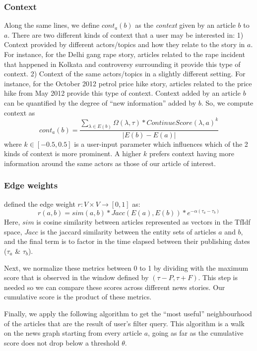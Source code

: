 \subsubsection*{Context}
Along the same lines, we define $cont_{a}(b)$ as the \emph{context} given by an article $b$ to $a$. There are two different kinds of context that a user may be interested in: 1) Context provided by different actors/topics and how they relate
to the story in $a$. For instance, for the Delhi gang rape story, articles related to the rape incident that happened in Kolkata and controversy surrounding it provide this type of context. 2) Context of the same actors/topics in a slightly different setting. For instance, for the October 2012 petrol price hike story, articles related to the price hike from May 2012 provide this type of context. Context added by an article $b$ can be quantified by the degree of ``new information'' added by $b$.
So, we compute context as
\begin{equation}
cont_{a}(b) = \frac{\sum_{\lambda \in E(b)}{\Omega(\lambda, \tau)*ContinueScore(\lambda, a)^{k}}}{|E(b) - E(a)|}
\end{equation}
where $k \in [-0.5, 0.5]$ is a user-input parameter which influences which of the 2 kinds of context is more prominent. A higher $k$ prefers context having more information
around the same actors as those of our article of interest.

\subsubsection*{Edge weights}
\cite{choudhary@ecir2008} defined the edge weight $r:V \times V \rightarrow [0,1]$ as:
\begin{equation}
r(a, b) = sim(a,b) * Jacc(E(a), E(b)) * e^{-\alpha(\tau_a - \tau_b)}
\end{equation}
Here, $sim$ is cosine similarity between articles represented as vectors in the TfIdf space, $Jacc$ is the jaccard similarity between
the entity sets of articles $a$ and $b$, and the final term is to factor in the time elapsed between their publishing dates ($\tau_a$ \& $\tau_b$).

Next, we normalize these metrics between 0 to 1 by dividing with the maximum score that is observed in the window defined by $(\tau - P, \tau + F)$. This
step is needed so we can compare these scores across different news stories. Our cumulative score is the product of these metrics.

Finally, we apply the following algorithm to get the ``most useful'' neighbourhood of the articles that are the result of user's filter query. This algorithm is a walk on the news graph starting from every article $a$, 
going as far as the cumulative score does not drop below a threshold $\theta$.

